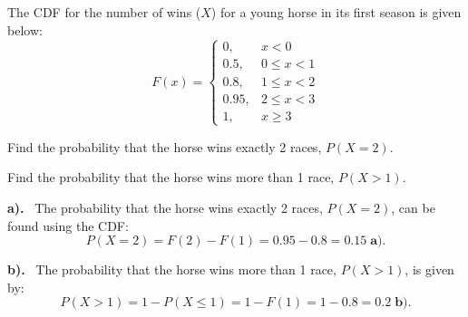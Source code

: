 \documentclass[a4paper, 10pt]{article}
\begin{document}
\begin{problem}
The CDF for the number of wins (\( X \)) for a young horse in its first season is given below:
\[
    F(x) =
    \begin{cases}
    0, & x < 0\\
    0.5, & 0 \leq x < 1\\
    0.8, & 1 \leq x < 2\\
    0.95, & 2 \leq x < 3\\
    1, & x \geq 3
    \end{cases}
\]
\begin{subproblems}
    \item Find the probability that the horse wins exactly 2 races, \( P(X = 2) \).
    \item Find the probability that the horse wins more than 1 race, \( P(X > 1) \).
\end{subproblems}
\end{problem}

\begin{solution}
\par\noindent\textbf{a).} \, The probability that the horse wins exactly 2 races, \( P(X = 2) \), can be found using the CDF:
\[
    P(X = 2) = F(2) - F(1) = 0.95 - 0.8 = \boxed{0.15} \; \textbf{a).}
\]

\vspace{2mm}

\par\noindent\textbf{b).} \, The probability that the horse wins more than 1 race, \( P(X > 1) \), is given by:
\[
    P(X > 1) = 1 - P(X \leq 1) = 1 - F(1) = 1 - 0.8 = \boxed{0.2} \; \textbf{b).}
\]
\end{solution}
\end{document}
